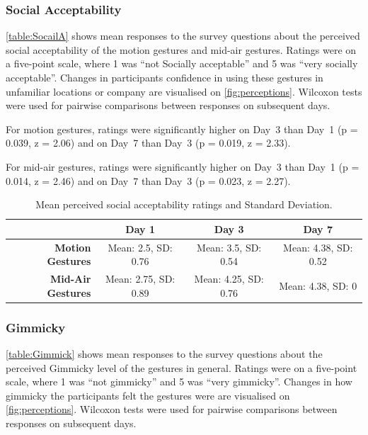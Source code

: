 \documentclass{l4proj}
\begin{document}
\subsubsection{Social Acceptability}

\autoref{table:SocailA} shows mean responses to the survey questions about the perceived social acceptability of the motion gestures and mid-air gestures. Ratings were on a five-point scale, where 1 was ``not Socially acceptable'' and 5 was ``very socially acceptable''. Changes in participants confidence in using these gestures in unfamiliar locations or company are visualised on \autoref{fig:perceptions}. Wilcoxon tests were used for pairwise comparisons between responses on subsequent days.

For motion gestures, ratings were significantly higher on Day~3 than Day~1 (p = 0.039, z = 2.06) and on Day~7 than Day~3 (p = 0.019, z = 2.33).

For mid-air gestures, ratings were significantly higher on Day~3 than Day~1 (p = 0.014, z = 2.46) and on Day~7 than Day~3 (p = 0.023, z = 2.27).

\begin{table}
\centering
\begin{tabular}{r c c c}
                              & \textbf{Day 1} & \textbf{Day 3} & \textbf{Day 7} \\ \toprule
    \textbf{Motion Gestures}  & Mean: 2.5, SD: 0.76   & Mean: 3.5, SD: 0.54    & Mean: 4.38, SD: 0.52  \\
    \textbf{Mid-Air Gestures} & Mean: 2.75, SD: 0.89   & Mean: 4.25, SD: 0.76    & Mean: 4.38, SD: 0 \\ \bottomrule
\end{tabular}
\caption{Mean perceived social acceptability ratings and Standard Deviation.}
\label{table:SocailA}
\end{table}



\subsubsection{Gimmicky}

\autoref{table:Gimmick} shows mean responses to the survey questions about the perceived Gimmicky level of the gestures in general. Ratings were on a five-point scale, where 1 was ``not gimmicky'' and 5 was ``very gimmicky''. Changes in how gimmicky the participants felt the gestures were are visualised on \autoref{fig:perceptions}. Wilcoxon tests were used for pairwise comparisons between responses on subsequent days.
\end{document}
